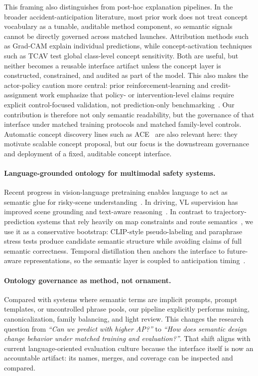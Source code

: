 This framing also distinguishes \method{} from post-hoc explanation pipelines.
In the broader accident-anticipation literature, most prior work does not treat
concept vocabulary as a tunable, auditable method component, so semantic signals
cannot be directly governed across matched launches.
Attribution methods such as Grad-CAM
\citep{selvaraju2017gradcam} explain individual predictions, while
concept-activation techniques such as TCAV
\citep{kim2018tcav} test global class-level concept sensitivity.
Both are useful, but neither becomes a reusable interface artifact unless the
concept layer is constructed, constrained, and audited as part of the model.
This also makes the actor-policy caution more central: prior reinforcement-learning
and credit-assignment work emphasize that policy- or intervention-level claims require explicit control-focused validation, not prediction-only benchmarking~\citep{konda1999actor,meulemans2023cocoa}.
Our contribution is therefore not only semantic readability, but the governance
of that interface under matched training protocols and matched family-level controls.
Automatic concept discovery lines such as ACE~\citep{ghorbani2019ace} are also
relevant here: they motivate scalable concept proposal, but our focus is the
downstream governance and deployment of a fixed, auditable concept interface.

\paragraph{Language-grounded ontology for multimodal safety systems.}
Recent progress in vision-language pretraining enables language to act as
semantic glue for risky-scene understanding~\citep{radford2021learning,jia2021align}.  
In driving, VL supervision has improved scene grounding and text-aware
reasoning~\citep{liao2024gpt,shi2025scvlm}. In contrast to trajectory-prediction systems that rely heavily on map constraints and route semantics~\citep{ref215}, we use it as a conservative
bootstrap: CLIP-style pseudo-labeling and paraphrase stress tests produce
candidate semantic structure while avoiding claims of full semantic correctness.
Temporal distillation then anchors the interface to future-aware representations,
so the semantic layer is coupled to anticipation timing~\citep{fang2022traffic}.

\paragraph{Ontology governance as method, not ornament.}
Compared with systems where semantic terms are implicit prompts, prompt templates,
or uncontrolled phrase pools, our pipeline explicitly performs mining,
canonicalization, family balancing, and light review. This changes the research
question from \emph{``Can we predict with higher AP?''} to \emph{``How does
semantic design change behavior under matched training and evaluation?''}.  
That shift aligns with current language-oriented evaluation culture because the
interface itself is now an accountable artifact: its names, merges, and coverage can
be inspected and compared.

